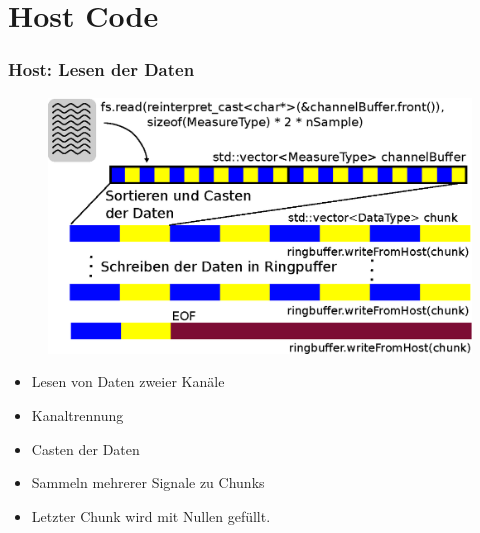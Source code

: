 \documentclass[ddcfooter]{tudbeamer}
\begin{document}
\section{Host Code}
\begin{frame}
    \frametitle*{Host: Lesen der Daten}
    \begin{minipage}{0.6\textwidth}
        \begin{figure}
            \includegraphics[scale=.5]{Datareader.eps}
        \end{figure}
    \end{minipage} \hfill
    \begin{minipage}{0.28\textwidth}
        \begin{itemize}
            \item Lesen von Daten zweier Kanäle
            \item Kanaltrennung
            \item Casten der Daten
            \item Sammeln mehrerer Signale zu Chunks
            \item Letzter Chunk wird mit Nullen gefüllt.
        \end{itemize}
    \end{minipage}
\end{frame}
\end{document}
